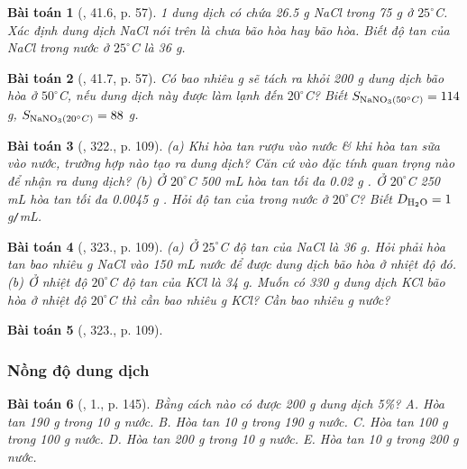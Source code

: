 \documentclass{article}
\newtheorem{baitoan}{Bài toán}
\begin{document}
\begin{baitoan}[\cite{SBT_Hoa_Hoc_8}, 41.6, p. 57]
	1 dung dịch có chứa \emph{26.5 g NaCl} trong \emph{75 g } ở $25^\circ$\emph{C}. Xác định dung dịch \emph{NaCl} nói trên là chưa bão hòa hay bão hòa. Biết độ tan của \emph{NaCl} trong nước ở $25^\circ$\emph{C} là \emph{36 g}.
\end{baitoan}

\begin{baitoan}[\cite{SBT_Hoa_Hoc_8}, 41.7, p. 57]
	Có bao nhiêu \emph{g } sẽ tách ra khỏi \emph{200 g} dung dịch bão hòa \emph{} ở $50^\circ$\emph{C}, nếu dung dịch này được làm lạnh đến $20^\circ$\emph{C}? Biết \emph{$S_{\ce{NaNO3}(50^\circ C)} = 114$ g, $S_{\ce{NaNO3}(20^\circ C)} = 88$ g}.
\end{baitoan}

\begin{baitoan}[\cite{An_350_BT_Hoa_Hoc_8}, 322., p. 109]
	(a) Khi hòa tan rượu vào nước \& khi hòa tan sữa vào nước, trường hợp nào tạo ra dung dịch? Căn cứ vào đặc tính quan trọng nào để nhận ra dung dịch? (b) Ở $20^\circ$\emph{C 500 mL } hòa tan tối đa \emph{0.02 g }. Ở $20^\circ$\emph{C 250 mL } hòa tan tối đa \emph{0.0045 g }. Hỏi độ tan của \emph{} trong nước ở $20^\circ$\emph{C}? Biết $D_{\ce{H2O}} = 1$ \emph{g\texttt{/}mL}.
\end{baitoan}

\begin{baitoan}[\cite{An_350_BT_Hoa_Hoc_8}, 323., p. 109]
	(a) Ở $25^\circ$\emph{C} độ tan của \emph{NaCl} là \emph{36 g}. Hỏi phải hòa tan bao nhiêu \emph{g NaCl} vào \emph{150 mL} nước để được dung dịch bão hòa ở nhiệt độ đó. (b) Ở nhiệt độ $20^\circ$\emph{C} độ tan của \emph{KCl} là \emph{34 g}. Muốn có \emph{330 g} dung dịch \emph{KCl} bão hòa ở nhiệt độ $20^\circ$\emph{C} thì cần bao nhiêu \emph{g KCl}? Cần bao nhiêu \emph{g} nước?
\end{baitoan}

\begin{baitoan}[\cite{An_350_BT_Hoa_Hoc_8}, 323., p. 109]
	
\end{baitoan}

\subsubsection{Nồng độ dung dịch}

\begin{baitoan}[\cite{SGK_Hoa_Hoc_8}, 1., p. 145]
	Bằng cách nào có được \emph{200 g} dung dịch \emph{ 5\%}? {\sf A.} Hòa tan \emph{190 g } trong \emph{10 g} nước. {\sf B.} Hòa tan \emph{10 g } trong \emph{190 g} nước. {\sf C.} Hòa tan \emph{100 g } trong \emph{100 g} nước. {\sf D.} Hòa tan \emph{200 g } trong \emph{10 g} nước. {\sf E.} Hòa tan \emph{10 g } trong \emph{200 g} nước.
\end{baitoan}
\end{document}
